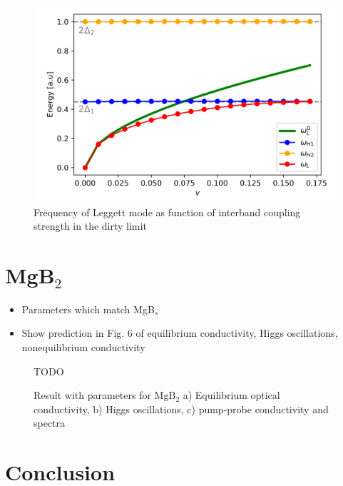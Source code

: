 \documentclass[aps,prb,reprint,noeprint,superscriptaddress]{revtex4-2}
\begin{document}
\begin{figure}[H]
    \centering
    \includegraphics[width=\columnwidth]{figures/leggett_coupling.png}
    \caption{\label{fig:leggett_coupling}%
    Frequency of Leggett mode as function of interband coupling strength in the dirty limit}
\end{figure}%



\section{MgB$_2$}
\label{sec:mgb2}

\begin{itemize}
	\item Parameters which match MgB$_s$
	\item Show prediction in Fig. 6 of equilibrium conductivity, Higgs oscillations, nonequilibrium conductivity
\end{itemize}

\begin{figure}[H]
    \centering
    \Huge{TODO}
    \caption{\label{fig:mgb2}%
    Result with parameters for MgB$_2$ a) Equilibrium optical conductivity, b) Higgs oscillations, c) pump-probe conductivity and spectra}
\end{figure}%



\section{Conclusion}
\label{sec:conclusion}
\end{document}

